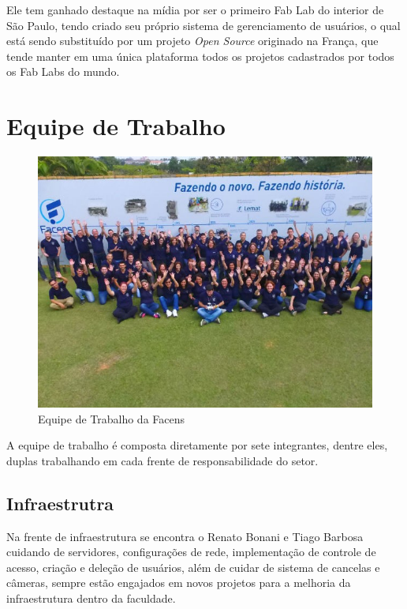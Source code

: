 \documentclass[
	12pt,				%
	oneside,			%
	a4paper,			%
	chapter=TITLE,		%
	section=TITLE,		%
	sumario=tradicional %
	english,			%
	french,				%
	spanish,			%
	brazil				%
	]{abntex2}
\begin{document}
Ele tem ganhado destaque na mídia por ser o primeiro Fab Lab do interior de São Paulo, tendo criado seu próprio sistema de gerenciamento de usuários, o qual está sendo substituído por um projeto \textit{Open Source} originado na França, que tende manter em uma única plataforma todos os projetos cadastrados por todos os Fab Labs do mundo. 

\section{Equipe de Trabalho}

\begin{figure}[htb]
	\caption{\label{fig:equipefacens} Equipe de Trabalho da Facens}
	\begin{center}
		\includegraphics[scale=0.6]{equipefacens}
	\end{center}
\end{figure}

\label{sec:equipetrabalho}
A equipe de trabalho é composta diretamente por sete integrantes, dentre eles, duplas trabalhando em cada frente de responsabilidade do setor.

\subsection{Infraestrutra}
Na frente de infraestrutura se encontra o Renato Bonani e Tiago Barbosa cuidando de servidores, configurações de rede, implementação de controle de acesso, criação e deleção de usuários, além de cuidar de sistema de cancelas e câmeras, sempre estão engajados em novos projetos para a melhoria da infraestrutura dentro da faculdade.
\end{document}
